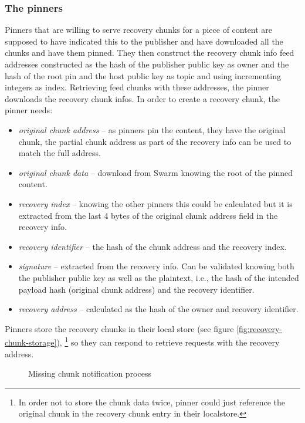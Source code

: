  
\subsubsection{The pinners}

Pinners that are willing to serve recovery chunks for a piece of content are supposed to have indicated this to the  publisher and have downloaded all the chunks and have them pinned. They then construct the recovery chunk info feed addresses constructed as the hash of the publisher public key as owner and the hash of the root pin and the host public key as topic and using incrementing integers as index. Retrieving feed chunks with these addresses, the pinner downloads the recovery chunk infos.
In order to create a recovery chunk, the pinner needs:

\begin{itemize}
\item \emph{original chunk address} -- as pinners pin the content, they have the original chunk, the partial chunk address as part of the recovery info can be used to match the full address.
\item \emph{original chunk data} -- download from Swarm knowing the root of the pinned content.
\item \emph{recovery index} -- knowing the other pinners this could be calculated but it is extracted from the last 4 bytes of the original chunk address field in the recovery info. 
\item \emph{recovery identifier} -- the hash of the chunk address and the recovery index.
\item \emph{signature} -- extracted from the recovery info. Can be validated knowing both the publisher public key as well as the plaintext, i.e., the hash of the intended payload hash (original chunk address) and the recovery identifier.
\item \emph{recovery address} -- calculated as the hash of the owner and recovery identifier.
\end{itemize}

Pinners store the recovery chunks in their local store (see figure \ref{fig:recovery-chunk-storage}), %
\footnote{In order not to store the chunk data twice, pinner could just reference the original chunk in the recovery chunk entry in their localstore.}  so they can respond to retrieve requests with the recovery address.

\begin{figure}[htbp]
  \centering
  \caption[Missing chunk notification process \statusred]{Missing chunk notification process}
  \label{fig:missing-chunk-notification}
\end{figure}

